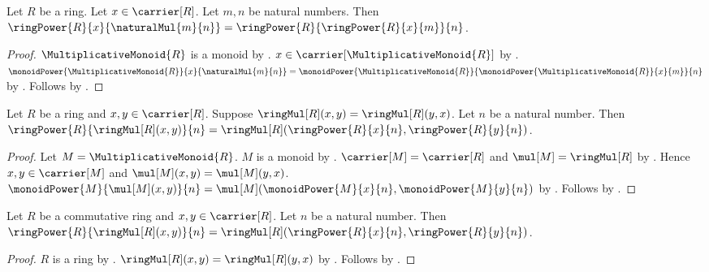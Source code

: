 \begin{theorem}\label{ring_power_multiplication}
    Let $R$ be a ring.
    Let $x\in\carrier[R]$.
    Let $m,n$ be natural numbers.
    Then $\ringPower{R}{x}{\naturalMul{m}{n}}=
        \ringPower{R}{\ringPower{R}{x}{m}}{n}$.
\end{theorem}
\begin{proof}
    $\MultiplicativeMonoid{R}$ is a monoid by
        .
    $x\in\carrier[\MultiplicativeMonoid{R}]$ by
        .
    $\monoidPower{\MultiplicativeMonoid{R}}{x}{
            \naturalMul{m}{n}}=
        \monoidPower{\MultiplicativeMonoid{R}}{
            \monoidPower{\MultiplicativeMonoid{R}}{x}{m}}{n}$ by
        .
    Follows by .
\end{proof}

\begin{theorem}\label{ring_power_of_commuting_product}
    Let $R$ be a ring and $x,y\in\carrier[R]$.
    Suppose $\ringMul[R](x,y)=\ringMul[R](y,x)$.
    Let $n$ be a natural number.
    Then
        $\ringPower{R}{\ringMul[R](x,y)}{n}
            =\ringMul[R](\ringPower{R}{x}{n},
                \ringPower{R}{y}{n})$.
\end{theorem}
\begin{proof}
    Let $M=\MultiplicativeMonoid{R}$.
    $M$ is a monoid by
        .
    $\carrier[M]=\carrier[R]$ and $\mul[M]=\ringMul[R]$ by
        .
    Hence $x,y\in\carrier[M]$ and
        $\mul[M](x,y)=\mul[M](y,x)$.
    $\monoidPower{M}{\mul[M](x,y)}{n}
        =\mul[M](\monoidPower{M}{x}{n},
            \monoidPower{M}{y}{n})$ by
        .
    Follows by
        .
\end{proof}

\begin{corollary}\label{commutative_ring_power_of_product}
    Let $R$ be a commutative ring and $x,y\in\carrier[R]$.
    Let $n$ be a natural number.
    Then
        $\ringPower{R}{\ringMul[R](x,y)}{n}
            =\ringMul[R](\ringPower{R}{x}{n},
                \ringPower{R}{y}{n})$.
\end{corollary}
\begin{proof}
    $R$ is a ring by .
    $\ringMul[R](x,y)=\ringMul[R](y,x)$ by
        .
    Follows by .
\end{proof}


